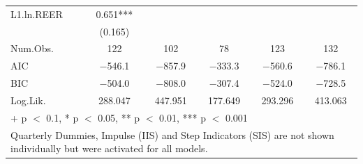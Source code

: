 \begin{table}
{\begin{tabular}[t]{lccccc}
L1.ln.REER & \num{0.651}*** &  &  &  & \\
 & (\num{0.165}) &  &  &  & \\
\midrule
Num.Obs. & \num{122} & \num{102} & \num{78} & \num{123} & \num{132}\\
AIC & \num{-546.1} & \num{-857.9} & \num{-333.3} & \num{-560.6} & \num{-786.1}\\
BIC & \num{-504.0} & \num{-808.0} & \num{-307.4} & \num{-524.0} & \num{-728.5}\\
Log.Lik. & \num{288.047} & \num{447.951} & \num{177.649} & \num{293.296} & \num{413.063}\\
\bottomrule
\multicolumn{6}{l}{\rule{0pt}{1em}+ p $<$ 0.1, * p $<$ 0.05, ** p $<$ 0.01, *** p $<$ 0.001}\\
\multicolumn{6}{l}{\rule{0pt}{1em}Quarterly Dummies, Impulse (IIS) and Step Indicators (SIS) are not shown individually but were activated for all models.}\\
\end{tabular}}
\end{table}

